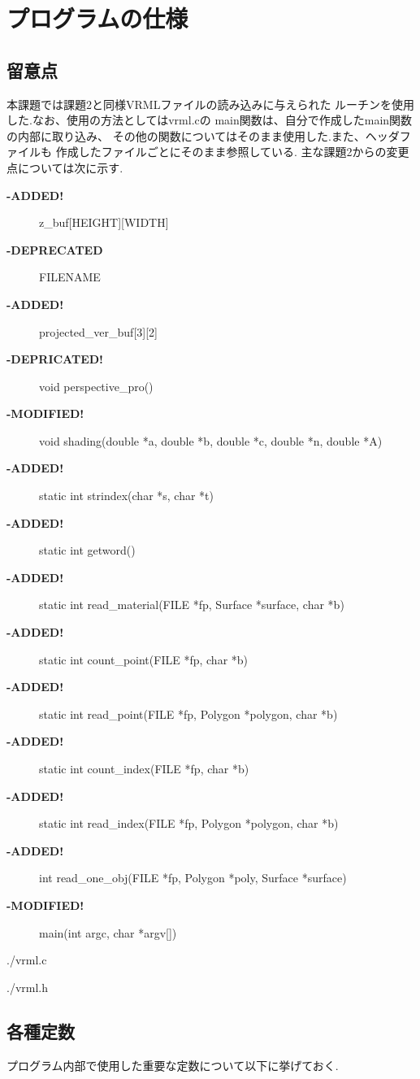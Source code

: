 \documentclass[a4j,dvipdfmx]{jsarticle}
\begin{document}
\section{プログラムの仕様}
\subsection{留意点}
本課題では課題2と同様VRMLファイルの読み込みに与えられた
ルーチンを使用した.なお、使用の方法としてはvrml.cの
main関数は、自分で作成したmain関数の内部に取り込み、
その他の関数についてはそのまま使用した.また、ヘッダファイルも
作成したファイルごとにそのまま参照している.
主な課題2からの変更点については次に示す.
\begin{description}
\item[{\bf -ADDED!}]z\_buf[HEIGHT][WIDTH]
\item[{\bf -DEPRECATED}]FILENAME
\item[{\bf -ADDED!}]projected\_ver\_buf[3][2]
\item[{\bf -DEPRICATED!}]void perspective\_pro()
\item[{\bf -MODIFIED!}]void shading(double *a, double *b, double *c, double *n, double *A)
\item[{\bf -ADDED!}]static int strindex(char *s, char *t)
\item[{\bf -ADDED!}]static int getword()
\item[{\bf -ADDED!}]static int read\_material(FILE *fp, Surface *surface, char *b)
\item[{\bf -ADDED!}]static int count\_point(FILE *fp, char *b)
\item[{\bf -ADDED!}]static int read\_point(FILE *fp, Polygon *polygon, char *b)
\item[{\bf -ADDED!}]static int count\_index(FILE *fp, char *b)
\item[{\bf -ADDED!}]static int read\_index(FILE *fp, Polygon *polygon, char *b)
\item[{\bf -ADDED!}]int read\_one\_obj(FILE *fp, Polygon *poly, Surface *surface)
\item[{\bf -MODIFIED!}]main(int argc, char *argv[])
\end{description}


                {./vrml.c}
                

                {./vrml.h}

\subsection{各種定数}
プログラム内部で使用した重要な定数について以下に挙げておく.
\end{document}
